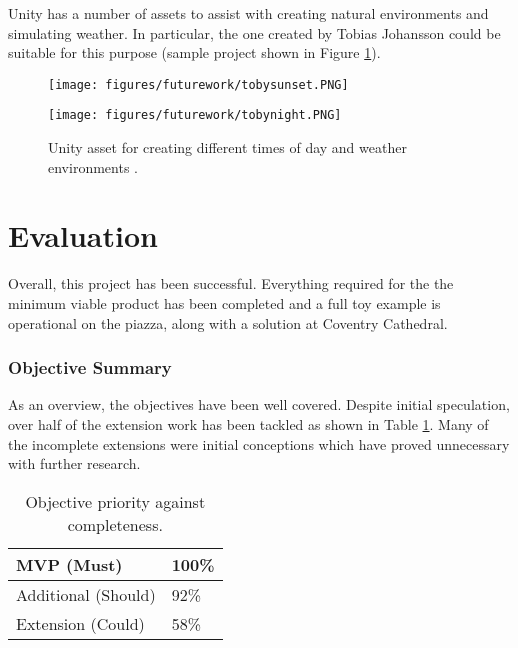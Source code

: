\documentclass{article}
\begin{document}
Unity has a number of assets to assist with creating natural environments and simulating weather. In particular, the one created by Tobias Johansson could be suitable for this purpose \cite{futurework:weather} (sample project shown in Figure \ref{fig:weather}).

\begin{figure}[H]
\centering
\begin{minipage}{.44\textwidth}
  \centering
  \texttt{[image: figures/futurework/tobysunset.PNG]}
\end{minipage}%
\begin{minipage}{.42\textwidth}
  \centering
  \texttt{[image: figures/futurework/tobynight.PNG]}
\end{minipage}
\label{fig:weather}
\caption{Unity asset for creating different times of day 
and weather environments \cite{futurework:weather}.}
\end{figure}

\section{Evaluation}
\label{Evaluation}
Overall, this project has been successful. Everything required for the the minimum viable product has been completed and a full toy example is operational on the piazza, along with a solution at Coventry Cathedral. 

\subsubsection{Objective Summary}
As an overview, the objectives have been well covered. Despite initial speculation, over half of the extension work has been tackled as shown in Table \ref{table:objectivesummary}. Many of the incomplete extensions were initial conceptions which have proved unnecessary with further research.

\begin{table}[H]
\centering
\begin{tabular}{|l|l|}
\hline
MVP (Must)          & 100\% \\ \hline
Additional (Should) & 92\%  \\ \hline
Extension (Could)   & 58\%  \\ \hline
\end{tabular}
\caption{Objective priority against completeness.}
\label{table:objectivesummary}
\end{table}
\end{document}
